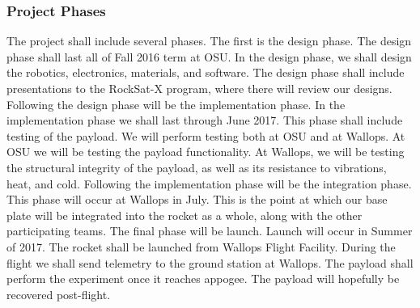 \subsubsection{Project Phases}
The project shall include several phases. The first is the design phase.
The design phase shall last all of Fall 2016 term at OSU.
In the design phase, we shall design the robotics, electronics, materials, and software.
The design phase shall include presentations to the RockSat-X program, where there will review our designs.
Following the design phase will be the implementation phase.
In the implementation phase we shall last through June 2017.
This phase shall include testing of the payload.
We will perform testing both at OSU and at Wallops.
At OSU we will be testing the payload functionality.
At Wallops, we will be testing the structural integrity of the payload, as well as its resistance to vibrations, heat, and cold.
Following the implementation phase will be the integration phase.
This phase will occur at Wallops in July.
This is the point at which our base plate will be integrated into the rocket as a whole, along with the other participating teams.
The final phase will be launch. Launch will occur in Summer of 2017.
The rocket shall be launched from Wallops Flight Facility.
During the flight we shall send telemetry to the ground station at Wallops.
The payload shall perform the experiment once it reaches appogee.
The payload will hopefully be recovered post-flight.

